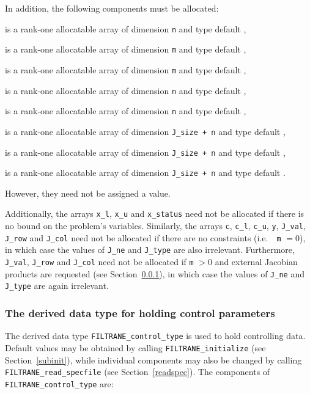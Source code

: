 \documentclass{galahad}
\newcommand{\packagename}{FILTRANE}
\begin{document}
\noindent
In addition, the following components must be allocated:
\begin{description}
 is a rank-one allocatable array of dimension {\tt n} and type 
default \integer,

 is a rank-one allocatable array of dimension {\tt m} and type 
default \realdp,

 is a rank-one allocatable array of dimension {\tt m} and type 
default \realdp,

 is a rank-one allocatable array of dimension {\tt n} and type 
default \realdp,

 is a rank-one allocatable array of dimension {\tt n} and type 
default \logical,

 is a rank-one allocatable array of dimension {\tt J\_size + n} and
type default \realdp,

 is a rank-one allocatable array of dimension {\tt J\_size + n} and
type default \integer,

 is a rank-one allocatable array of dimension {\tt J\_size + n} and
type default \integer.
\end{description}
However, they need not be assigned a value.

\noindent
Additionally, the arrays {\tt x\_l}, {\tt x\_u} and {\tt x\_status} need not
be allocated if there is no bound on the problem's variables.  Similarly, the
arrays {\tt c}, {\tt c\_l}, {\tt c\_u}, {\tt y}, {\tt J\_val}, {\tt J\_row}
and {\tt J\_col} need not be allocated if there are no constraints (i.e.\ {\tt
m} $=0$), in which case the values of {\tt J\_ne} and {\tt J\_type} are also
irrelevant. Furthermore, {\tt J\_val}, {\tt J\_row} and {\tt J\_col} need not
be allocated if {\tt m} $>0$ and external Jacobian products are requested (see
Section~\ref{typecontrol}), in which case the values of {\tt J\_ne} and {\tt
J\_type} are again irrelevant.


\subsubsection{The derived data type for holding control 
 parameters}\label{typecontrol}
The derived data type 
{\tt \packagename\_control\_type} 
is used to hold controlling data. Default values may be obtained by calling 
{\tt \packagename\_initialize} (see Section~\ref{subinit}),
while individual components may also be changed by calling 
{\tt \packagename\_read\-\_specfile}
(see Section~\ref{readspec}). 
The components of 
{\tt \packagename\_control\_type} 
are:
\end{document}
